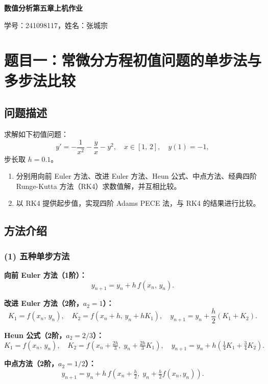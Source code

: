 \documentclass[UTF8,a4paper,11pt]{article}
\begin{document}
\begin{center}
{\huge \textbf{数值分析第五章上机作业}}

\vspace{0.3cm}
{\large 学号：241098117\quad，姓名：张城宗\quad}
\end{center}

\section{题目一：常微分方程初值问题的单步法与多步法比较}

\subsection{问题描述}

求解如下初值问题：
\[
  y' = -\frac{1}{x^2} - \frac{y}{x} - y^2, \quad x \in [1,\,2], \quad y(1) = -1,
\]
步长取 $h = 0.1$。

\begin{enumerate}[label=(\arabic*)]
  \item 分别用向前 Euler 方法、改进 Euler 方法、Heun 公式、中点方法、经典四阶 Runge-Kutta 方法（RK4）求数值解，并互相比较。
  \item 以 RK4 提供起步值，实现四阶 Adams PECE 法，与 RK4 的结果进行比较。
\end{enumerate}

\subsection{方法介绍}

\subsubsection*{(1) 五种单步方法}

\textbf{向前 Euler 方法（1阶）：}
\[
  y_{n+1} = y_n + h\,f(x_n,\,y_n).
\]

\textbf{改进 Euler 方法（2阶，$a_2=1$）：}
\[
  K_1 = f(x_n,\,y_n),\quad K_2 = f(x_n+h,\,y_n+hK_1),\quad
  y_{n+1} = y_n + \frac{h}{2}(K_1 + K_2).
\]

\textbf{Heun 公式（2阶，$a_2=2/3$）：}
\[
  K_1 = f(x_n,\,y_n),\quad K_2 = f\!\left(x_n+\tfrac{2h}{3},\;y_n+\tfrac{2h}{3}K_1\right),\quad
  y_{n+1} = y_n + h\!\left(\tfrac{1}{4}K_1 + \tfrac{3}{4}K_2\right).
\]

\textbf{中点方法（2阶，$a_2=1/2$）：}
\[
  y_{n+1} = y_n + h\,f\!\left(x_n+\tfrac{h}{2},\;y_n+\tfrac{h}{2}f(x_n,y_n)\right).
\]
\end{document}
